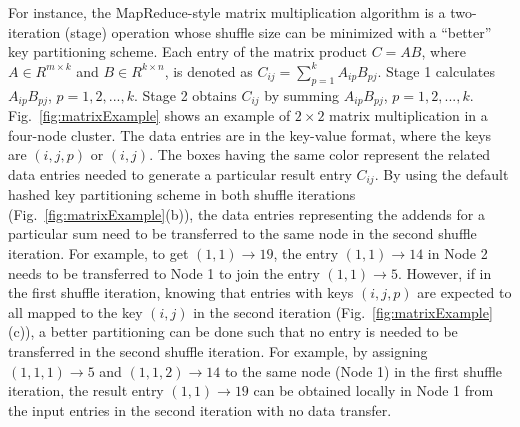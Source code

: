 \documentclass[10pt,journal,compsoc]{IEEEtran}
\begin{document}
For instance, the MapReduce-style matrix multiplication algorithm is a two-iteration
(stage) operation whose shuffle size can be minimized with a ``better''
key partitioning scheme.
Each entry of the matrix product $C=AB$, where $A \in R^{m \times k}$ and $B \in R^{k \times n}$, is denoted as $C_{ij}=\sum_{p=1}^k A_{ip}B_{pj}$. 
Stage 1 calculates $A_{ip}B_{pj}$, $p=1, 2, ..., k$. 
Stage 2 obtains $C_{ij}$ by summing $A_{ip}B_{pj}$, $p=1, 2, ..., k$.
Fig.~\ref{fig:matrixExample} shows an example of $2 \times 2$ matrix multiplication in a four-node cluster. 
The data entries are in the key-value format, where the keys are $(i,j,p)$ or $(i,j)$. 
The boxes having the same color represent
the related data entries needed to generate a particular result entry $C_{ij}$. 
By using the default hashed key partitioning scheme in both shuffle iterations
(Fig.~\ref{fig:matrixExample}(b)), the data entries representing the addends
for a particular sum need to be transferred to the same node in the
second shuffle iteration. %
For example, to get $(1,1) \rightarrow 19$, the entry $(1,1)\rightarrow 14$ in Node 2 needs to be transferred to Node 1 to join the entry $(1,1) \rightarrow 5$.
However, if in the first shuffle iteration, knowing that
entries with keys $(i,j,p)$ are expected to all mapped to the key $(i,j)$ in
the second iteration (Fig.~\ref{fig:matrixExample}(c)), a better partitioning can
be done such that no entry is needed to be transferred in the second shuffle
iteration.
For example, by assigning $(1,1,1)\rightarrow 5$ and $(1,1,2)
\rightarrow 14$ to the same node (Node 1) in the first shuffle iteration,
the result entry $(1,1) \rightarrow 19$ can be obtained locally in Node
1 from the input entries in the second iteration with no data transfer.
\end{document}
